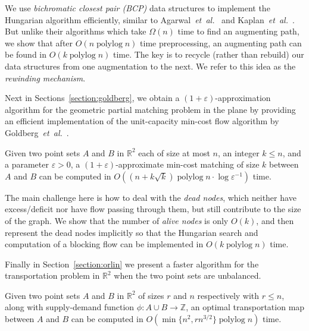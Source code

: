 \documentclass[11pt,twoside]{article}
\def\etal{\emph{et~al.}}
\def\etal{\textit{et~al.}}
\def\polylog{\mathop{\mathrm{polylog}}}
\def\eps{\varepsilon}
\def\reals{\mathbb{R}}
\def\ints{\mathbb{Z}}
\def\tsupply{\phi}
\theoremstyle{plain}
\numberwithin{figure}{section}
\begin{document}
We use \emph{bichromatic closest pair (BCP)} data structures to implement the Hungarian algorithm efficiently, similar to Agarwal~\etal~\cite{AES99} and Kaplan~\etal~\cite{KMRSS17}.
But unlike their algorithms which take $\Omega(n)$ time to find an
augmenting path, we show that after $O(n\polylog n)$ time preprocessing,
an augmenting path can be found in $O(k\polylog n)$ time.
The key is to recycle (rather than rebuild) our data structures from one
augmentation to the next.
We refer to this idea as the \emph{rewinding mechanism}.

\medskip

Next in Sections~\ref{section:goldberg},
we obtain a $(1+\eps)$-approximation algorithm for the geometric partial
matching problem in the plane by providing an efficient implementation of the
unit-capacity min-cost flow algorithm by Goldberg~\etal~\cite{GHKT17}.

\begin{theorem}
\label{theorem:gmcm}
Given two point sets $A$ and $B$ in $\reals^2$ each of size at most $n$,
an integer $k \leq n$, and a parameter $\eps > 0$, a $(1+\eps)$-approximate
min-cost matching of size $k$ between $A$ and $B$ can be computed in
$O((n + k\sqrt{k})\polylog n \cdot \log\eps^{-1})$ time.
\end{theorem}

The main challenge here is how to deal with the \emph{dead nodes},
which neither have excess/deficit nor have flow passing through them,
but still contribute to the size of the graph.
We show that the number of \emph{alive nodes} is only $O(k)$, and then
represent the dead nodes implicitly so that the Hungarian search and
computation of a blocking flow can be implemented in $O(k\polylog n)$ time.

\medskip

Finally in Section~\ref{section:orlin} we present a faster algorithm for the
transportation problem in $\reals^2$ when the two point sets are unbalanced.

\begin{theorem}
\label{theorem:orlin}
Given two point sets $A$ and $B$ in $\reals^2$ of sizes $r$ and $n$ respectively
with $r \leq n$, along with supply-demand function $\tsupply:A \cup B \to \ints$,
an optimal transportation map between $A$ and $B$ can be computed in
$O(\min\{n^2, rn^{3/2}\}\polylog n)$ time.
\end{theorem}
\end{document}
